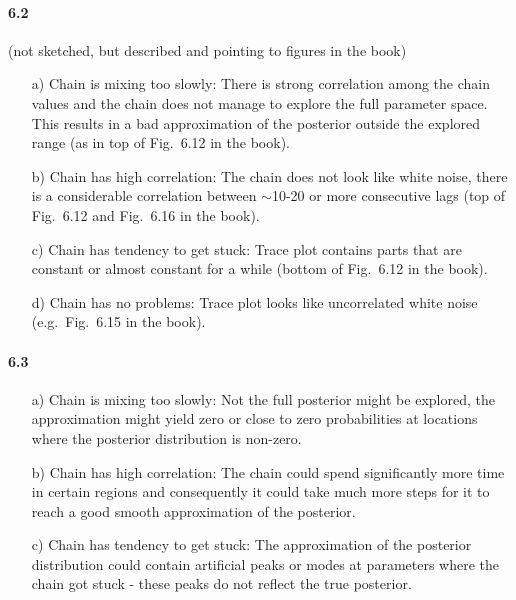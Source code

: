 \documentclass[fontsize=11pt,DIV=18,parskip=half]{scrartcl}
\begin{document}
\paragraph{6.2} (not sketched, but described and pointing to figures in the book)
\begin{enumerate}
\item[a)] Chain is mixing too slowly: There is strong correlation among the chain values and the chain does not manage to explore the full parameter space. This results in a bad approximation of the posterior outside the explored range (as in top of Fig.~6.12 in the book).
\item[b)] Chain has high correlation: The chain does not look like white noise, there is a considerable correlation between $\sim$10-20 or more consecutive lags (top of Fig.~6.12 and Fig.~6.16 in the book).
\item[c)] Chain has tendency to get stuck: Trace plot contains parts that are constant or almost constant for a while (bottom of Fig.~6.12 in the book).
\item[d)] Chain has no problems: Trace plot looks like uncorrelated white noise (e.g.~Fig.~6.15 in the book).
\end{enumerate}

\paragraph{6.3}
\begin{enumerate}
\item[a)] Chain is mixing too slowly: Not the full posterior might be explored, the approximation might yield zero or close to zero probabilities at locations where the posterior distribution is non-zero.
\item[b)] Chain has high correlation: The chain could spend significantly more time in certain regions and consequently it could take much more steps for it to reach a good smooth approximation of the posterior.
\item[c)] Chain has tendency to get stuck: The approximation of the posterior distribution could contain artificial peaks or modes at parameters where the chain got stuck - these peaks do not reflect the true posterior.
\end{enumerate}
\end{document}
